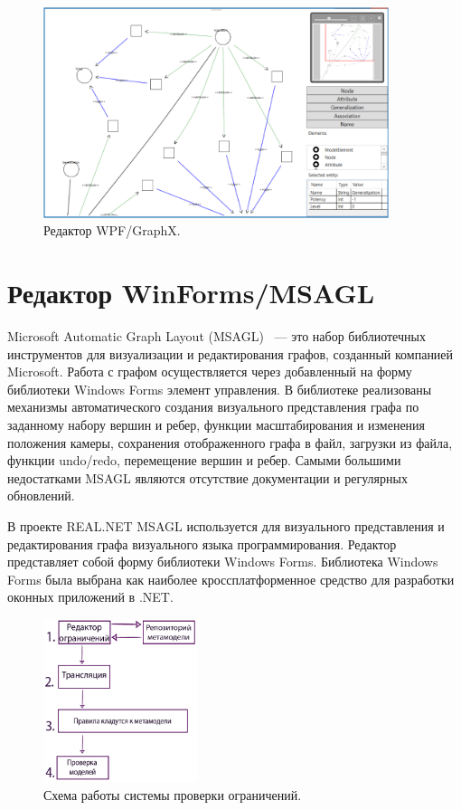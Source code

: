\documentclass{spisok-article}
\begin{document}
\begin{figure}[ht]
	\centering
	\includegraphics[width=0.9\textwidth]{screenshot.png}
	\caption{Редактор WPF/GraphX.}
	\label{image:screenshot}
\end{figure}

\section{Редактор WinForms/MSAGL}

Microsoft Automatic Graph Layout (MSAGL)~\cite{pupyrev2010bundling} --- это набор библиотечных инструментов для визуализации и редактирования графов, созданный компанией Microsoft. Работа с графом осуществляется через добавленный на форму библиотеки Windows Forms элемент управления. В библиотеке реализованы механизмы автоматического создания визуального представления графа по заданному набору вершин и ребер, функции масштабирования и изменения положения камеры, сохранения отображенного графа в файл, загрузки из файла, функции undo/redo, перемещение вершин и ребер. Самыми большими недостатками MSAGL являются отсутствие документации и регулярных обновлений.

В проекте REAL.NET MSAGL используется для визуального представления и редактирования графа визуального языка программирования. Редактор представляет собой форму библиотеки Windows Forms. Библиотека Windows Forms была выбрана как наиболее кроссплатформенное средство для разработки оконных приложений в .NET.

\begin{figure}
	\begin{center}
		\includegraphics[width=0.4\textwidth]{constraints.png}
		\caption{Схема работы системы проверки ограничений.}
		\label{image:constraints}
	\end{center}
\end{figure}
\end{document}
